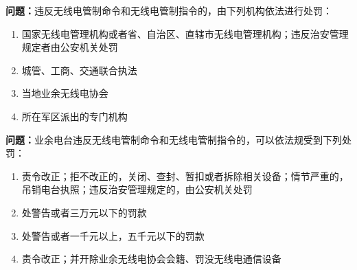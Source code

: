 \textbf{问题：}违反无线电管制命令和无线电管制指令的，由下列机构依法进行处罚：
\begin{enumerate}[label=\Alph*), leftmargin=3em]
	\item 国家无线电管理机构或者省、自治区、直辖市无线电管理机构；违反治安管理规定者由公安机关处罚
	\item 城管、工商、交通联合执法
	\item 当地业余无线电协会
	\item 所在军区派出的专门机构
\end{enumerate}

\textbf{问题：}业余电台违反无线电管制命令和无线电管制指令的，可以依法规受到下列处罚：
\begin{enumerate}[label=\Alph*), leftmargin=3em]
	\item  责令改正；拒不改正的，关闭、查封、暂扣或者拆除相关设备；情节严重的，吊销电台执照；违反治安管理规定的，由公安机关处罚
	\item  处警告或者三万元以下的罚款
	\item  处警告或者一千元以上，五千元以下的罚款
	\item  责令改正；并开除业余无线电协会会籍、罚没无线电通信设备
\end{enumerate}

